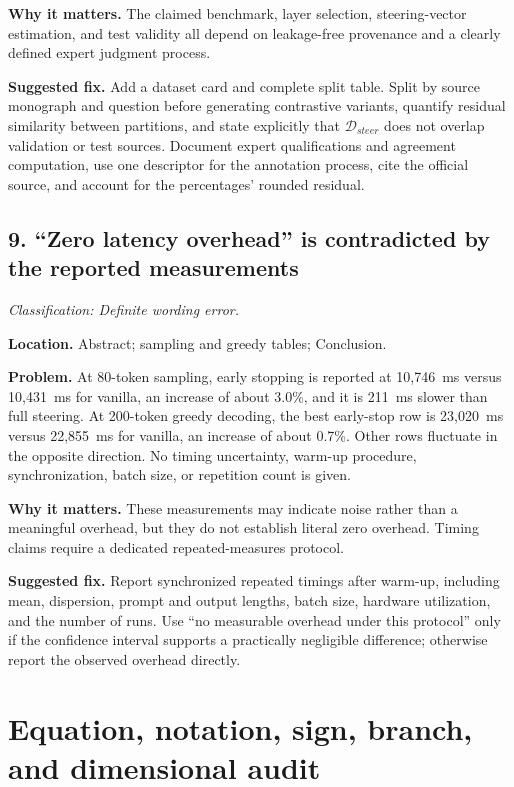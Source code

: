 \documentclass[11pt]{article}
\newcommand{\findinglabel}[1]{\textbf{#1}}
\newcommand{\classification}[1]{\textit{Classification: #1.}}
\begin{document}
\findinglabel{Why it matters.} The claimed benchmark, layer selection, steering-vector estimation, and test validity all depend on leakage-free provenance and a clearly defined expert judgment process.

\findinglabel{Suggested fix.} Add a dataset card and complete split table.  Split by source monograph and question before generating contrastive variants, quantify residual similarity between partitions, and state explicitly that $\mathcal{D}_{steer}$ does not overlap validation or test sources.  Document expert qualifications and agreement computation, use one descriptor for the annotation process, cite the official source, and account for the percentages' rounded residual.

\subsection*{9. ``Zero latency overhead'' is contradicted by the reported measurements}

\classification{Definite wording error}

\findinglabel{Location.} Abstract; sampling and greedy tables; Conclusion.

\findinglabel{Problem.} At 80-token sampling, early stopping is reported at 10,746~ms versus 10,431~ms for vanilla, an increase of about 3.0\%, and it is 211~ms slower than full steering.  At 200-token greedy decoding, the best early-stop row is 23,020~ms versus 22,855~ms for vanilla, an increase of about 0.7\%.  Other rows fluctuate in the opposite direction.  No timing uncertainty, warm-up procedure, synchronization, batch size, or repetition count is given.

\findinglabel{Why it matters.} These measurements may indicate noise rather than a meaningful overhead, but they do not establish literal zero overhead.  Timing claims require a dedicated repeated-measures protocol.

\findinglabel{Suggested fix.} Report synchronized repeated timings after warm-up, including mean, dispersion, prompt and output lengths, batch size, hardware utilization, and the number of runs.  Use ``no measurable overhead under this protocol'' only if the confidence interval supports a practically negligible difference; otherwise report the observed overhead directly.

\section*{Equation, notation, sign, branch, and dimensional audit}
\end{document}

